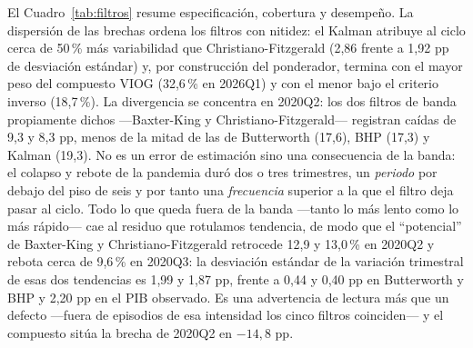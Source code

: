 \documentclass[11pt]{article}
\begin{document}
El Cuadro~\ref{tab:filtros} resume especificación, cobertura y desempeño. La dispersión de las
brechas ordena los filtros con nitidez: el Kalman atribuye al ciclo cerca de 50\,\% más
variabilidad que Christiano-Fitzgerald (2,86 frente a 1,92 pp de desviación estándar) y, por
construcción del ponderador, termina con el mayor peso del compuesto VIOG (32,6\,\% en 2026Q1)
y con el menor bajo el criterio inverso (18,7\,\%). La divergencia se concentra en 2020Q2: los
dos filtros de banda propiamente dichos ---Baxter-King y Christiano-Fitzgerald--- registran
caídas de 9,3 y 8,3 pp, menos de la mitad de las de Butterworth (17,6), BHP (17,3) y Kalman
(19,3). No es un error de estimación sino una consecuencia de la banda: el colapso y rebote de la
pandemia duró dos o tres trimestres, un \emph{periodo} por debajo del piso de seis y por tanto
una \emph{frecuencia} superior a la que el filtro deja pasar al ciclo. Todo lo que queda fuera
de la banda ---tanto lo más lento como lo más rápido--- cae al residuo que rotulamos tendencia,
de modo que el ``potencial'' de Baxter-King y Christiano-Fitzgerald retrocede 12,9 y 13,0\,\%
en 2020Q2 y rebota cerca de 9,6\,\% en 2020Q3: la desviación estándar de la variación
trimestral de esas dos tendencias es 1,99 y 1,87 pp, frente a 0,44 y 0,40 pp en Butterworth y
BHP y 2,20 pp en el PIB observado. Es una advertencia de lectura más que un defecto ---fuera
de episodios de esa intensidad los cinco filtros coinciden--- y el compuesto sitúa la brecha de
2020Q2 en $-14{,}8$ pp.
\end{document}
